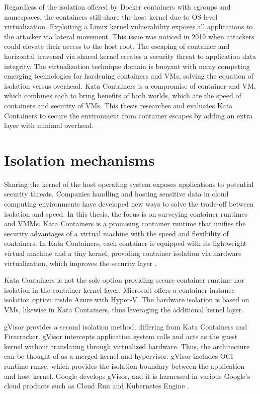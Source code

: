 Regardless of the isolation offered by Docker containers with cgroups and namespaces, the containers still share the host kernel due to OS-level virtualization. Exploiting a Linux kernel vulnerability exposes all applications to the attacker via lateral movement. This issue was noticed in 2019 \cite{CVE-2020-14386}\cite{CVE-2019-5736} when attackers could elevate their access to the host root. The escaping of container and horizontal traversal via shared kernel creates a security threat to application data integrity. The virtualization technique domain is buoyant with many competing emerging technologies for hardening containers and VMs, solving the equation of isolation versus overhead. Kata Containers is a compromise of container and VM, which combines each to bring benefits of both worlds, which are the speed of containers and security of VMs. This thesis researches and evaluates Kata Containers to secure the environment from container escapes by adding an extra layer with minimal overhead. \cite{EdgeComputing5G}

\section{Isolation mechanisms}
\label{section:isolation}

Sharing the kernel of the host operating system exposes applications to potential security threats. Companies handling and hosting sensitive data in cloud computing environments have developed new ways to solve the trade-off between isolation and speed. In this thesis, the focus is on surveying container runtimes and VMMs. Kata Containers is a promising container runtime that unifies the security advantages of a virtual machine with the speed and flexibility of containers. In Kata Containers, each container is equipped with its lightweight virtual machine and a tiny kernel, providing container isolation via hardware virtualization, which improves the security layer \cite{Kumar2020}.

Kata Containers is not the sole option providing secure container runtime nor isolation in the container kernel layer. Microsoft offers a container instance isolation option inside Azure with Hyper-V. The hardware isolation is based on VMs, likewise in Kata Containers, thus leveraging the additional kernel layer. \cite{Hyper-V}

gVisor provides a second isolation method, differing from Kata Containers and Firecracker. gVisor intercepts application system calls and acts as the guest kernel without translating through virtualized hardware. Thus, the architecture can be thought of as a merged kernel and hypervisor. gVisor includes OCI runtime runsc, which provides the isolation boundary between the application and host kernel. Google develops gVisor, and it is harnessed in various Google's cloud products such as Cloud Run \cite{CloudRun} and Kubernetes Engine \cite{GKE}. \cite{Debab2021}\cite{gVisor}

